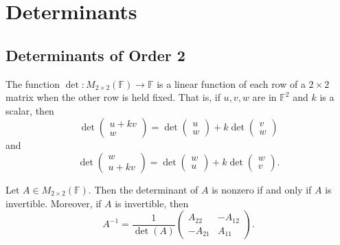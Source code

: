 \section{Determinants}
\subsection{Determinants of Order 2}
\begin{theorem}
    The function \(\det: M_{2 \times 2}(\mathbb{F}) \to \mathbb{F}\) is a linear function of each row of a \(2 \times 2\) matrix when the other row is held fixed. That is, if \(u, v, w\) are in \(\mathbb{F}^2\) and \(k\) is a scalar, then
    \[
    \det \begin{pmatrix} u + kv \\ w \end{pmatrix}
    = \det \begin{pmatrix} u \\ w \end{pmatrix} + k \det \begin{pmatrix} v \\ w \end{pmatrix}
    \]
    and
    \[
    \det \begin{pmatrix} w \\ u + kv \end{pmatrix}
    = \det \begin{pmatrix} w \\ u \end{pmatrix} + k \det \begin{pmatrix} w \\ v \end{pmatrix}.
    \]
\end{theorem}
\vspace{5cm}
\begin{theorem}
    Let \(A \in M_{2 \times 2}(\mathbb{F})\). Then the determinant of \(A\) is nonzero if and only if \(A\) is invertible. Moreover, if \(A\) is invertible, then
    \[
    A^{-1} = \frac{1}{\det(A)} 
    \begin{pmatrix}
        A_{22} & -A_{12} \\
        -A_{21} & A_{11}
    \end{pmatrix}.
    \]
\end{theorem}
\newpage
